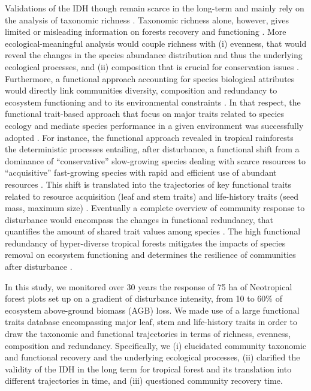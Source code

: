 \documentclass[
  11pt,
  french,
  A4paper,
  extrafontsizes,onecolumn,openright
  ]{memoir}
\begin{document}
Validations of the IDH though remain scarce in the long-term and mainly
rely on the analysis of taxonomic richness \autocite{Molino2001}.
Taxonomic richness alone, however, gives limited or misleading
information on forests recovery and functioning
\autocite{Chaudhary2016}. More ecological-meaningful analysis would
couple richness with (i) evenness, that would reveal the changes in the
species abundance distribution and thus the underlying ecological
processes, and (ii) composition that is crucial for conservation issues
\autocites{Lavorel2002}{Bellwood2006}. Furthermore, a functional
approach accounting for species biological attributes would directly
link communities diversity, composition and redundancy to ecosystem
functioning and to its environmental constraints
\autocites{Violle2007b}{Baraloto2012a}. In that respect, the functional
trait-based approach that focus on major traits related to species
ecology and mediate species performance in a given environment was
successfully adopted \autocite{Diaz2005}. For instance, the functional
approach revealed in tropical rainforests the deterministic processes
entailing, after disturbance, a functional shift from a dominance of
``conservative'' slow-growing species dealing with scarce resources to
``acquisitive'' fast-growing species with rapid and efficient use of
abundant resources \autocites{Reich2014}{Herault2011}. This shift is
translated into the trajectories of key functional traits related to
resource acquisition (leaf and stem traits) and life-history traits
(seed mass, maximum size)
\autocites{Wright2004}{TerSteege2006}{Westoby2006a}{Chave2009b}.
Eventually a complete overview of community response to disturbance
would encompass the changes in functional redundancy, that quantifies
the amount of shared trait values among species \autocite{Carmona2016}.
The high functional redundancy of hyper-diverse tropical forests
\autocite{Bellwood2006} mitigates the impacts of species removal on
ecosystem functioning and determines the resilience of communities after
disturbance \autocites{Elmqvist2003}{Diaz2005}.

In this study, we monitored over 30 years the response of 75 ha of
Neotropical forest plots set up on a gradient of disturbance intensity,
from 10 to 60\% of ecosystem above-ground biomass (AGB) loss. We made
use of a large functional traits database encompassing major leaf, stem
and life-history traits in order to draw the taxonomic and functional
trajectories in terms of richness, evenness, composition and redundancy.
Specifically, we (i) elucidated community taxonomic and functional
recovery and the underlying ecological processes, (ii) clarified the
validity of the IDH in the long term for tropical forest and its
translation into different trajectories in time, and (iii) questioned
community recovery time.
\end{document}
